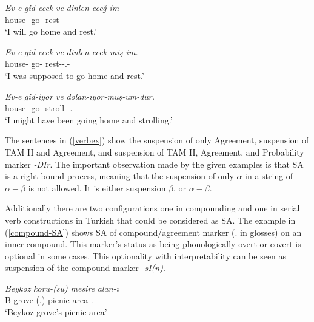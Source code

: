 \begin{exe}
    \ex \label{verbex}
    \begin{xlist}
        \ex 
        \gll 
        \textit{Ev-e} \textit{gid-ecek} \textit{ve} \textit{dinlen-eceğ-im} \\ house-{\Dat} go-{\Fut} {\And} rest-{\Fut}-{\First}{\Sg} \\
        \glt `I will go home and rest.'
        
        \ex 
        \gll 
        \textit{Ev-e} \textit{gid-ecek} \textit{ve} \textit{dinlen-ecek-miş-im.} \\ house-{\Dat} go-{\Fut} {\And} rest-{\Fut}-{\Cop}.{\Evi}-{\First}{\Sg} \\
        \glt  `I was supposed to go home and rest.'
        
        \ex 
        \gll 
        \textit{Ev-e} \textit{gid-iyor} \textit{ve} \textit{dolan-ıyor-muş-um-dur.} \\ house-{\Dat} go-{\Fut} {\And} stroll-{\Prog}-{\Cop}.{\Evi}-{\First}{\Sg}-{\Prob} \\
        \glt `I might have been going home and strolling.'
    \end{xlist}
\end{exe}
The sentences in (\ref{verbex}) show the suspension of only Agreement, suspension of TAM II and Agreement, and suspension of TAM II, Agreement, and Probability marker \textit{-DIr}. The important observation made by the given examples is that SA is a right-bound process, meaning that the suspension of only $\alpha$ in a string of $\alpha-\beta$ is not allowed. It is either suspension $\beta$, or $\alpha-\beta$.

Additionally there are two configurations one in compounding and one in serial verb constructions in Turkish that could be considered as SA. The example in (\ref{compound-SA}) shows SA of compound/agreement marker ({\Third}{\Sg}.{\Poss} in glosses) on an inner compound. This marker's status as being phonologically overt or covert is optional in some cases. This optionality with interpretability can be seen as suspension of the compound marker \textit{-sI(n)}.

\begin{exe}
    \ex \label{compound-SA}
    \gll
    \textit{Beykoz} \textit{koru-(su)} \textit{mesire} \textit{alan-ı} \\ B grove-({\Third}{\Sg}.{\Poss}) picnic area-{\Third}{\Sg}.{\Poss} \\
    \glt `Beykoz grove's picnic area'
 \end{exe}
 
